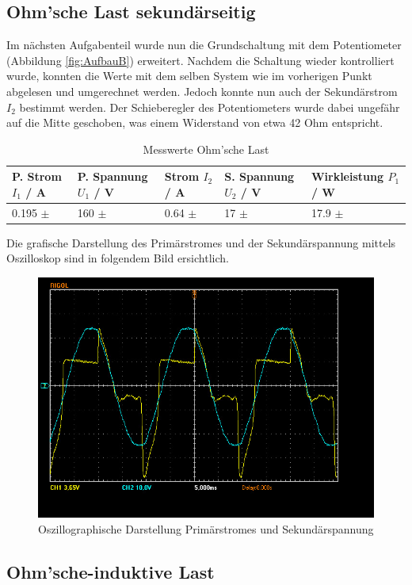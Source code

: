 \documentclass[12pt,a4paper,twoside]{article}
\begin{document}
\subsection{Ohm'sche Last sekundärseitig}

Im nächsten Aufgabenteil wurde nun die Grundschaltung mit dem Potentiometer (Abbildung \ref{fig:AufbauB}) erweitert. Nachdem die Schaltung wieder kontrolliert wurde, konnten die Werte mit dem selben System wie im vorherigen Punkt abgelesen und umgerechnet werden.
Jedoch konnte nun auch der Sekundärstrom $I_{2}$ bestimmt werden. Der Schieberegler des Potentiometers wurde dabei ungefähr auf die Mitte geschoben, was einem Widerstand von etwa 42 Ohm entspricht.

\begin{table}[H]
    \centering
    \caption{Messwerte Ohm'sche Last}
    \label{tab:messwerteOhm}
    \begin{tabular}{| l | l | l | l | l |}
        \hline
        P. Strom $I_{1}$ / A  & P. Spannung $U_{1}$ / V & Strom $I_{2}$ / A & S. Spannung $U_{2}$ / V & Wirkleistung $P_{1}$ / W \\
        \hline
        0.195 $\pm$  & 160 $\pm$  & 0.64 $\pm$  & 17 $\pm$  & 17.9 $\pm$  \\
        \hline
    \end{tabular}
\end{table}

\noindent
Die grafische Darstellung des Primärstromes und der Sekundärspannung mittels Oszilloskop sind in folgendem Bild ersichtlich.

\begin{figure}[H]
    \centering
    \includegraphics[width=0.6\linewidth, angle=0]{nudes/A2 Oszi.jpg}
    \caption{Oszillographische Darstellung Primärstromes und Sekundärspannung}
    \label{fig:OszilloskopB}
\end{figure}


\subsection{Ohm'sche-induktive Last}
\end{document}
